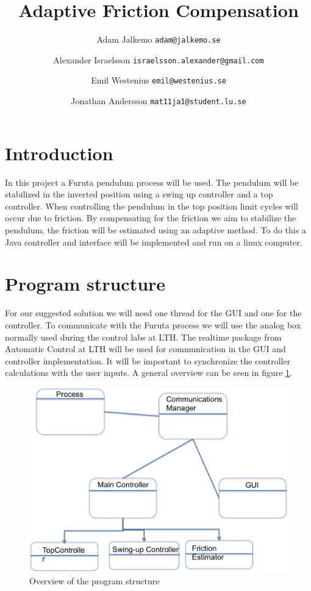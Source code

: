 \documentclass[10pt,a4paper]{article}
\author{Adam Jalkemo \texttt{adam@jalkemo.se} \and
Alexander Israelsson \texttt{israelsson.alexander@gmail.com} \and
Emil Westenius \texttt{emil@westenius.se} \and
Jonathan Andersson \texttt{mat11ja1@student.lu.se}}
\title{Adaptive Friction Compensation}
\begin{document}
\maketitle

\section{Introduction}
In this project a Furuta pendulum process will be used. The pendulum will be stabilized in the inverted position using a swing up controller and a top controller. When controlling the pendulum in the top position limit cycles will occur due to friction. By compensating for the friction we aim to stabilize the pendulum, the friction will be estimated using an adaptive method. To do this a Java controller and interface will be implemented and run on a linux computer.
\section{Program structure}
For our suggested solution we will need one thread for the GUI and one for the controller. To communicate with the Furuta process we will use the analog box normally used during the control labs at LTH. The realtime package from Automatic Control at LTH will be used for communication in the GUI and controller implementation. It will be important to synchronize the controller calculations with the user inputs. A general overview can be seen in figure \ref{fig:uml}.
\begin{figure}[H]
\centerline{\includegraphics[scale=0.7]{umlfuruta.png}}
\caption{Overview of the program structure}
\label{fig:uml}
\end{figure}
\end{document}
